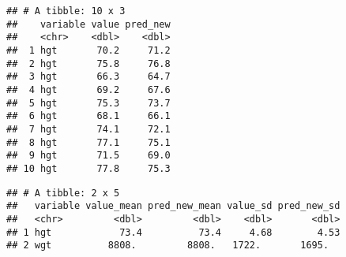 \documentclass[
]{book}
\newenvironment{Shaded}{\begin{snugshade}}{\end{snugshade}}
\newcommand{\DataTypeTok}[1]{\textcolor[rgb]{0.13,0.29,0.53}{#1}}
\newcommand{\DecValTok}[1]{\textcolor[rgb]{0.00,0.00,0.81}{#1}}
\newcommand{\KeywordTok}[1]{\textcolor[rgb]{0.13,0.29,0.53}{\textbf{#1}}}
\newcommand{\NormalTok}[1]{#1}
\newcommand{\OperatorTok}[1]{\textcolor[rgb]{0.81,0.36,0.00}{\textbf{#1}}}
\newcommand{\StringTok}[1]{\textcolor[rgb]{0.31,0.60,0.02}{#1}}
\begin{document}
\begin{Shaded}
\end{Shaded}

\begin{verbatim}
## # A tibble: 10 x 3
##    variable value pred_new
##    <chr>    <dbl>    <dbl>
##  1 hgt       70.2     71.2
##  2 hgt       75.8     76.8
##  3 hgt       66.3     64.7
##  4 hgt       69.2     67.6
##  5 hgt       75.3     73.7
##  6 hgt       68.1     66.1
##  7 hgt       74.1     72.1
##  8 hgt       77.1     75.1
##  9 hgt       71.5     69.0
## 10 hgt       77.8     75.3
\end{verbatim}

\begin{Shaded}
\end{Shaded}

\begin{verbatim}
## # A tibble: 2 x 5
##   variable value_mean pred_new_mean value_sd pred_new_sd
##   <chr>         <dbl>         <dbl>    <dbl>       <dbl>
## 1 hgt            73.4          73.4     4.68        4.53
## 2 wgt          8808.         8808.   1722.       1695.
\end{verbatim}
\end{document}
